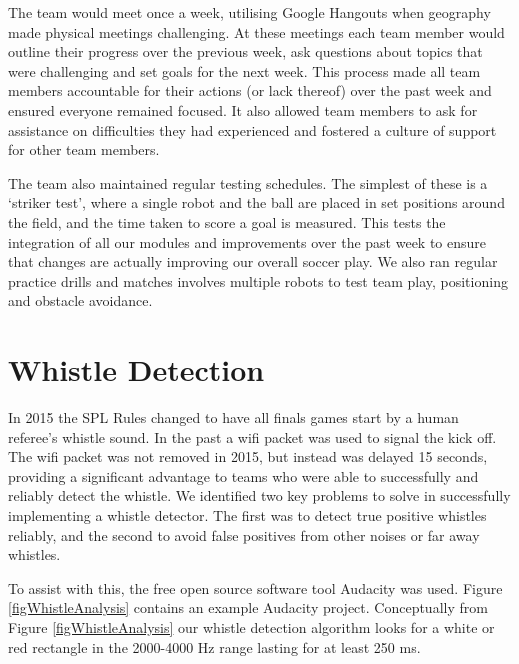 \documentclass[runningheads,a4paper]{llncs}
\begin{document}
The team would meet once a week, utilising Google Hangouts when geography made physical meetings challenging. At these meetings each team member would outline their progress over the previous week, ask questions about topics that were challenging and set goals for the next week. This process made all team members accountable for their actions (or lack thereof) over the past week and ensured everyone remained focused. It also allowed team members to ask for assistance on difficulties they had experienced and fostered a culture of support for other team members.

The team also maintained regular testing schedules. The simplest of these is a  `striker test', where a single robot and the ball are placed in set positions around the field, and the time taken to score a goal is measured. This tests the integration of all our modules and improvements over the past week to ensure that changes are actually improving our overall soccer play. We also ran regular practice drills and matches involves multiple robots to test team play, positioning and obstacle avoidance.

\section{Whistle Detection}

In 2015 the SPL Rules changed to have all finals games start by a human referee's whistle sound. In the past a wifi packet was used to signal the kick off. The wifi packet was not removed in 2015, but instead was delayed 15 seconds, providing a significant advantage to teams who were able to successfully and reliably detect the whistle. We identified two key problems to solve in successfully implementing a whistle detector. The first was to detect true positive whistles reliably, and the second to avoid false positives from other noises or far away whistles.

To assist with this, the free open source software tool Audacity was used. Figure \ref{figWhistleAnalysis} contains an example Audacity project. Conceptually from Figure \ref{figWhistleAnalysis} our whistle detection algorithm looks for a white or red rectangle in the 2000-4000 Hz range lasting for at least 250 ms.
\end{document}
